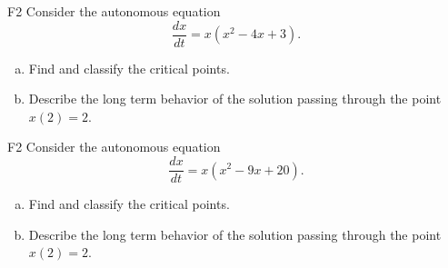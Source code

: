 \begin{problem}{F2}
Consider the autonomous equation
\[
\frac{dx}{dt} = x(x^2 - 4x + 3).
\]
\begin{enumerate}[(a)]
\item Find and classify the critical points.
\item Describe the long term behavior of the solution passing through the point $x(2)=2$.
\end{enumerate}
\end{problem}

\begin{problem}{F2}
Consider the autonomous equation
\[
\frac{dx}{dt} = x(x^2 - 9x + 20).
\]
\begin{enumerate}[(a)]
\item Find and classify the critical points.
\item Describe the long term behavior of the solution passing through the point $x(2)=2$.
\end{enumerate}
\end{problem}

